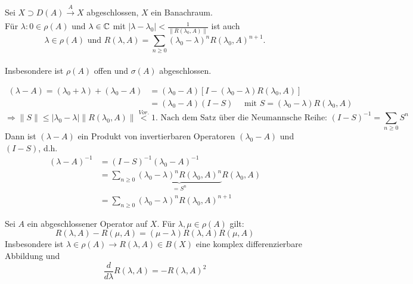 \begin{satz}[Resolventendarstellung]
	Sei $X \supset D(A) \xrightarrow[]{A} X$ abgeschlossen, $X$ ein Banachraum. \\
	Für $\lambda:{0} \in \rho(A)$ und $\lambda \in \mathbb{C}$ mit $|\lambda - \lambda_{0}| < \frac{1}{\| R(\lambda_{0}, A) \|}$ ist auch \\
		\[ \lambda \in \rho(A) \text{ und } R(\lambda, A) = \sum_{n \geq 0} (\lambda_{0} - \lambda)^{n} R(\lambda_{0}, A)^{n + 1}. \] \\
	Insbesondere ist $\rho(A)$ offen und $\sigma(A)$ abgeschlossen.
\end{satz}

\begin{beweis}
	\begin{align*}
		 (\lambda - A) = (\lambda_{0} + \lambda) + (\lambda_{0} - A) & = (\lambda_{0} - A)\left[I - (\lambda_{0} - \lambda) R(\lambda_{0}, A)\right] \\
		 & = (\lambda_{0} - A)(I - S) \quad \text{ mit } S = (\lambda_{0} - \lambda)R(\lambda_{0}, A)
	\end{align*}	
	\[ \Rightarrow \| S \| \leq | \lambda_{0} - \lambda| \| R(\lambda_{0}, A) \| \overset{Vor.}{<} 1. \text{ Nach dem Satz über die Neumannsche Reihe: } (I - S)^{-1} = \sum_{n \geq 0} S^{n} \]
	Dann ist $(\lambda - A)$ ein Produkt von invertierbaren Operatoren $(\lambda_{0} - A)$ und $(I - S)$, d.h. 
	\begin{align*}
		(\lambda - A)^{-1} & = (I - S)^{-1}(\lambda_{0} - A)^{-1} \\
			& = \sum_{n \geq 0} \underbrace{(\lambda_{0} - \lambda)^{n}R(\lambda_{0}, A)^{n}}_{= S^{n}} R(\lambda_{0}, A) \\
			& = \sum_{n \geq 0} (\lambda_{0} - \lambda)^{n} R(\lambda_{0}, A)^{n + 1}
	\end{align*} 
\end{beweis}


\begin{satz}[Resolventengleichung] 
	Sei $A$ ein abgeschlossener Operator auf $X$. Für $\lambda, \mu \in \rho(A)$ gilt:
		\[ R(\lambda, A) - R(\mu, A) = (\mu - \lambda) R(\lambda, A) R(\mu, A) \]
	Insbesondere ist $\lambda \in \rho(A) \rightarrow R(\lambda, A) \in B(X)$ eine komplex differenzierbare Abbildung und 
		\[ \frac{d}{d \lambda} R(\lambda, A) = - R(\lambda, A)^{2} \]
\end{satz}

